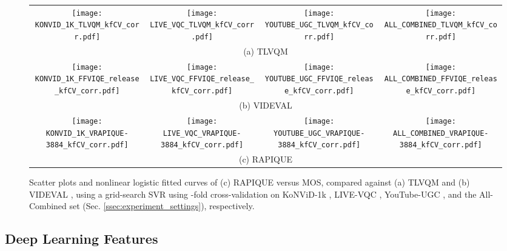 \documentclass[transmag]{IEEEtran}
\begin{document}
\begin{figure*}[!t]
\centering
\footnotesize
\def\xheight{0.245}
\setlength{\tabcolsep}{1pt}
\begin{tabular}{cccc}
\texttt{[image: KONVID\_1K\_TLVQM\_kfCV\_corr.pdf]} &
\texttt{[image: LIVE\_VQC\_TLVQM\_kfCV\_corr.pdf]} & 
 \texttt{[image: YOUTUBE\_UGC\_TLVQM\_kfCV\_corr.pdf]} &
\texttt{[image: ALL\_COMBINED\_TLVQM\_kfCV\_corr.pdf]} \\
\multicolumn{4}{c}{(a) TLVQM} \\
\texttt{[image: KONVID\_1K\_FFVIQE\_release\_kfCV\_corr.pdf]} &
\texttt{[image: LIVE\_VQC\_FFVIQE\_release\_kfCV\_corr.pdf]} & 
 \texttt{[image: YOUTUBE\_UGC\_FFVIQE\_release\_kfCV\_corr.pdf]} &
\texttt{[image: ALL\_COMBINED\_FFVIQE\_release\_kfCV\_corr.pdf]} \\
\multicolumn{4}{c}{(b) VIDEVAL} \\
\texttt{[image: KONVID\_1K\_VRAPIQUE-3884\_kfCV\_corr.pdf]} &
\texttt{[image: LIVE\_VQC\_VRAPIQUE-3884\_kfCV\_corr.pdf]} & 
 \texttt{[image: YOUTUBE\_UGC\_VRAPIQUE-3884\_kfCV\_corr.pdf]} &
\texttt{[image: ALL\_COMBINED\_VRAPIQUE-3884\_kfCV\_corr.pdf]} \\
\multicolumn{4}{c}{(c) RAPIQUE} \\
\end{tabular}
\caption{Scatter plots and nonlinear logistic fitted curves of (c) RAPIQUE versus MOS, compared against (a) TLVQM \cite{korhonen2019two} and (b) VIDEVAL \cite{tu2020ugc}, using a grid-search SVR using -fold cross-validation on KoNViD-1k \cite{hosu2017konstanz}, LIVE-VQC \cite{sinno2018large}, YouTube-UGC \cite{wang2019youtube}, and the All-Combined set (Sec. \ref{ssec:experiment_settings}), respectively.}
\label{fig:scatter_plot}
\end{figure*}

\subsection{Deep Learning Features}
\label{ssec:deep_learning_features}
\end{document}
